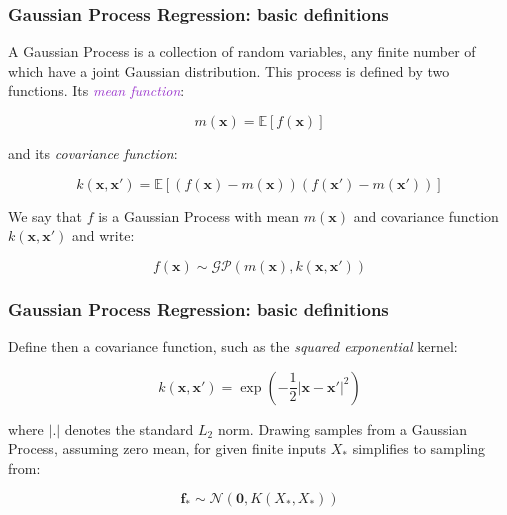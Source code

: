 \documentclass[10pt,usenames,dvipsnames]{beamer}
\begin{document}
	\begin{frame}
		\frametitle{Gaussian Process Regression: basic definitions}
		\begin{definition}
			A Gaussian Process is a collection of random variables, any finite number of which have a joint Gaussian distribution. This process is defined by two functions. Its \textcolor{DarkOrchid}{\textit{mean function}}:
			
			\begin{equation}
m(\boldsymbol{x}) = \mathbb{E}\left[f(\boldsymbol{x})\right]
			\end{equation}
			
			and its \textcolor{Mahogany}{\textit{covariance function}}:
			
			\begin{equation}
			k(\boldsymbol{x}, \boldsymbol{x'}) = \mathbb{E}\left[\left( f(\boldsymbol{x}) - m(\boldsymbol{x}) \right)\left( f(\boldsymbol{x}') - m(\boldsymbol{x}')\right)\right]
			\end{equation}
			
			We say that $f$ is a Gaussian Process with mean $m(\boldsymbol{x})$ and covariance function $k(\boldsymbol{x}, \boldsymbol{x}')$ and write:
			
			\begin{equation}
			f(\boldsymbol{x}) \sim \mathcal{GP}\left(m(\boldsymbol{x}), k(\boldsymbol{x}, \boldsymbol{x'}) \right)
			\end{equation}
			
			\end{definition}
		\end{frame}
			
		\begin{frame}	
			\frametitle{Gaussian Process Regression: basic definitions}
			Define then a covariance function, such as the \textit{squared exponential} kernel:
			
			\begin{equation}
			k(\boldsymbol{x}, \boldsymbol{x}') = \exp\left(-\dfrac{1}{2}|\boldsymbol{x} - \boldsymbol{x}'|^2\right)
			\end{equation}
			
			where $|.|$ denotes the standard $L_2$ norm. Drawing samples from a Gaussian Process, assuming zero mean, for given finite inputs $X_*$ simplifies to sampling from:
			
			\begin{equation}
			\label{fprior}
			\boldsymbol{f_*} \sim \mathcal{N}\left(\boldsymbol{0}, K(X_*, X_*)\right)
			\end{equation}
			
		\end{frame}
		
\end{document}
